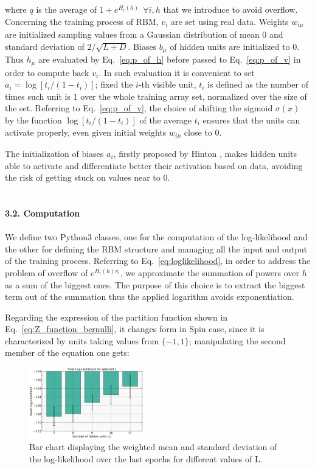 \documentclass[prl,twocolumn]{revtex4-1}
\begin{document}
where $q$ is the average of $1+e^{H_i(h)}\ \ \forall{i,h}$ that we introduce to avoid overflow. Concerning the training process of RBM, $v_i$ are set using real data. Weights $w_{i\mu}$ are initialized sampling values from a Gaussian distribution of mean $0$ and standard deviation of $2/\sqrt{L+D}$. Biases $b_\mu$ of hidden units are initialized to $0$. Thus $h_\mu$ are evaluated by Eq.~\ref{eq:p_of_h} before passed to Eq.~\ref{eq:p_of_v} in order to compute back $v_i$. In such evaluation it is convenient to set $a_i=\log[t_i/(1-t_i)]$; fixed the $i$-th visible unit, $t_i$ is defined as the number of times such unit is $1$ over the whole training array set, normalized over the size of the set. Referring to Eq.~\ref{eq:p_of_v}, the choice of shifting the sigmoid $\sigma(x)$ by the function $\log[t_i/(1-t_i)]$ of the average $t_i$ ensures that the units can activate properly, even given initial weights $w_{i\mu}$ close to $0$.

The initialization of biases $a_i$, firstly proposed by Hinton \cite{pap2}, makes hidden units able to activate and differentiate better their activation based on data, avoiding the risk of getting stuck on values near to $0$.
\\
\\
\\
\noindent\textbf{3.2. Computation}
\\
\\
We define two Python3 classes, one for the computation of the log-likelihood and the other for defining the RBM structure and managing all the input and output of the training process. Referring to Eq.~\ref{eq:loglikelihood}, in order to address the problem of overflow of $e^{H_i(h)v_i}$, we approximate the summation of powers over $h$ as a sum of the biggest ones. The purpose of this choice is to extract the biggest term out of the summation thus the applied logarithm avoids exponentiation.

Regarding the expression of the partition function shown in Eq.~\ref{eq:Z_function_bernulli}, it changes form in Spin case, since it is characterized by units taking values from $\{-1,1\}$; manipulating the second member of the equation one gets:

\begin{figure}[!tb]
	\includegraphics[width=0.44\textwidth]{L_of_L.jpg}
	\caption{Bar chart displaying the weighted mean and standard deviation of the log-likelihood over the last epochs for different values of L.}
	\label{fig:L_of_L}
\end{figure}
\end{document}

